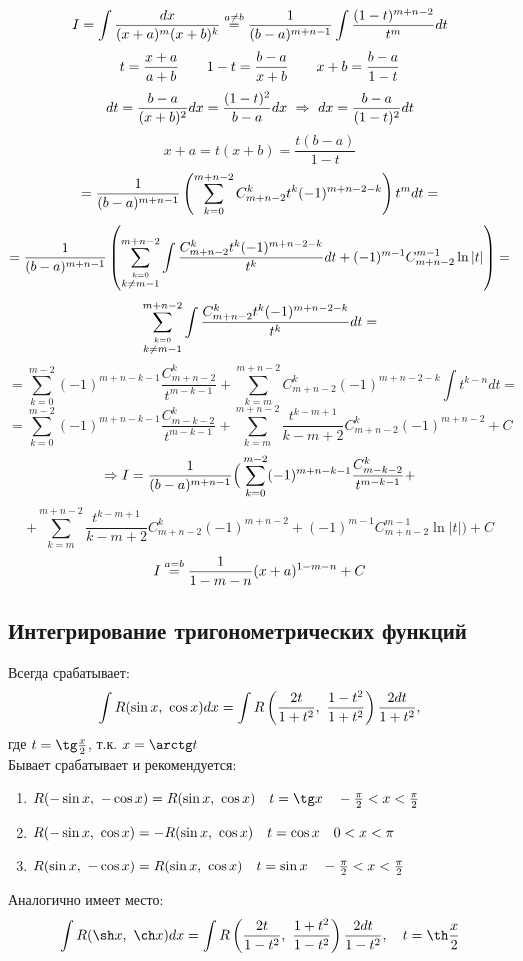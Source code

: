 \documentclass[main]{subfiles}
\begin{document}
    \begin{Example}
        \[I = \int \frac{dx}{(x + a)^m (x + b)^k} \overset{a \neq b}{=}
        \frac{1}{(b - a)^{m + n - 1}} \int \frac{(1 - t)^{m + n - 2}}{t^m} dt\]
        \[t = \frac{x + a}{a + b} \qquad 1 - t
        = \frac{b - a}{x + b} \qquad x + b = \frac{b - a}{1 - t}\]
        \[dt = \frac{b - a}{(x + b)^2} dx
        = \frac{(1 - t)^2}{b - a} dx
        \ \Rightarrow\  dx = \frac{b - a}{(1 - t)^2} dt\]
        \[x + a = t (x + b) = \frac{t(b - a)}{1 - t}\]
        \[= \frac{1}{(b - a)^{m + n - 1}}
        \left(\sum_{k = 0}^{m + n - 2} C_{m + n - 2}^k t^k (-1)^{m + n - 2 - k}\right){t^m} dt =\]
        \[= \frac{1}{(b-a)^{m + n - 1}}
        \left(\sum_{\overset{k = 0}{k \neq m - 1}}^{m + n - 2}
        \int \frac{C^k_{m + n - 2} t^k (-1)^{m + n - 2 - k}}{t^k} dt
        + (-1)^{m-1} C_{m+n-2}^{m-1} \ln|t|\right) =\]
        \[\sum_{\overset{k = 0}{k \neq m - 1}}^{m + n - 2}
        \int \frac{C^k_{m + n - 2} t^k (-1)^{m + n - 2 - k}}{t^k} dt =\]
        \[= \sum_{k = 0}^{m-2} (-1)^{m + n - k - 1} \frac{C_{m + n - 2}^k}{t^{m - k - 1}} +
        \sum_{k=m}^{m + n - 2} C_{m + n - 2}^k (-1)^{m + n -2 - k} \int t^{k-n} dt = \]
        \[= \sum_{k=0}^{m-2} (-1)^{m + n - k - 1} \frac{C_{m - k - 2}^k}{t^{m - k - 1}} +
        \sum_{k = m}^{m + n - 2} \frac{t^{k - m + 1}}{k - m + 2} C_{m + n - 2}^k (-1)^{m + n - 2} + C\]
        \[\Rightarrow I =
        \frac{1}{(b - a)^{m + n - 1}}
        \Big(\sum_{k=0}^{m-2} (-1)^{m + n - k - 1} \frac{C_{m - k - 2}^k}{t^{m - k - 1}} +\]
        \[+ \sum_{k = m}^{m + n - 2} \frac{t^{k - m + 1}}{k - m + 2} C_{m + n - 2}^k (-1)^{m + n - 2}
        + (-1)^{m-1} C_{m + n - 2}^{m-1} \ln|t|\Big) + C\]
        \[I \overset{a = b}{=} \frac{1}{1 - m - n} (x + a)^{1 - m - n} + C\]
    \end{Example}

    \newpage
    \subsection{Интегрирование тригонометрических функций}
    \begin{alg}
        Всегда срабатывает:
        \[\int R(\sin x,\ \cos x) dx = \int R \left(\frac{2t}{1 + t^2},\ \frac{1 - t^2}{1 + t^2}\right) \frac{2 dt}{1 + t^2},\]
        где $t = \tg \frac{x}{2}$, т.к. $x = \arctg t$\\
        Бывает срабатывает и рекомендуется:
        \begin{enumerate}
            \item $R(-\sin x,\ -\cos x) = R(\sin x,\ \cos x) \q t = \tg x \q -\frac{\pi}{2} < x < \frac{\pi}{2}$
            \item $R(-\sin x,\ \cos x) = - R(\sin x,\ \cos x) \q t = \cos x \q 0 < x < \pi$
            \item $R(\sin x,\ -\cos x) = R(\sin x,\ \cos x) \quad t = \sin x \quad -\frac{\pi}{2} < x < \frac{\pi}{2}$
        \end{enumerate}
        Аналогично имеет место:
        \[\int R(\sh x,\ \ch x) dx = \int R\Br{\frac{2t}{1 - t^2},\ \frac{1 + t^2}{1 - t^2}} \frac{2 dt}{1 - t^2},\q t = \th \frac{x}{2}\]
    \end{alg}
\end{document}
